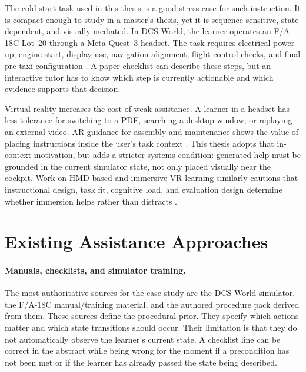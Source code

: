 The cold-start task used in this thesis is a good stress case for such
instruction. It is compact enough to study in a master's thesis, yet it is
sequence-sensitive, state-dependent, and visually mediated. In DCS World, the
learner operates an F/A-18C Lot~20 through a Meta Quest~3 headset. The task
requires electrical power-up, engine start, display use, navigation alignment,
flight-control checks, and final pre-taxi configuration
\citep{dcsworld,eagledynamics2023hornetguide}. A paper checklist can describe
these steps, but an interactive tutor has to know which step is currently
actionable and which evidence supports that decision.

Virtual reality increases the cost of weak assistance. A learner in a headset
has less tolerance for switching to a PDF, searching a desktop window, or
replaying an external video. AR guidance for assembly and maintenance shows
the value of placing instructions inside the user's task context
\citep{tang2003arassembly,henderson2011ar,palmarini2018ar}. This thesis
adopts that in-context motivation, but adds a stricter systems condition:
generated help must be grounded in the current simulator state, not only
placed visually near the cockpit. Work on HMD-based and immersive VR learning
similarly cautions that instructional design, task fit, cognitive load, and
evaluation design determine whether immersion helps rather than distracts
\citep{jensen2018vrhmd,radianti2020ivr,makransky2021camil}.

\section{Existing Assistance Approaches}\label{sec:bg-existing}

\paragraph{Manuals, checklists, and simulator training.}
The most authoritative sources for the case study are the DCS World simulator,
the F/A-18C manual/training material, and the authored procedure pack derived
from them. These sources define the procedural prior. They specify which
actions matter and which state transitions should occur. Their limitation is
that they do not automatically observe the learner's current state. A checklist
line can be correct in the abstract while being wrong for the moment if a
precondition has not been met or if the learner has already passed the state
being described.

